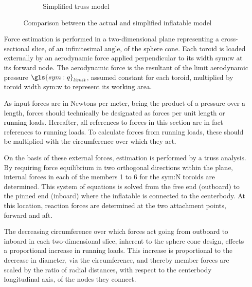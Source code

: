 \begin{figure}[h]
\begin{subfigure}[b]{0.3\textwidth}
	\caption{Simplified truss model} 
	\label{fig:TC2}
	\end{subfigure}
	\caption{Comparison between the actual and simplified inflatable model}
	\label{fig:TC}
\end{figure}

Force estimation is performed in a two-dimensional plane representing a cross-sectional slice, of an infinitesimal angle, of the sphere cone. Each toroid is loaded externally by an aerodynamic force applied perpendicular to its width \gls{sym:w} at its forward node. The aerodynamic force is the resultant of the limit aerodynamic pressure $\gls{sym:q}_{limit}$, assumed constant for each toroid, multiplied by toroid width \gls{sym:w} to represent its working area. 


As input forces are in Newtons per meter, being the product of a pressure over a length, forces should technically be designated as forces per unit length or running loads. Hereafter, all references to forces in this section are in fact references to running loads. To calculate forces from running loads, these should be multiplied with the circumference over which they act.

On the basis of these external forces, estimation is performed by a truss analysis. By requiring force equilibrium in two orthogonal directions within the plane, internal forces in each of the members 1 to 6 for the \gls{sym:N} toroids are determined. This system of equations is solved from the free end (outboard) to the pinned end (inboard) where the inflatable is connected to the centerbody. At this location, reaction forces are determined at the two attachment points, forward and aft.

The decreasing circumference over which forces act going from outboard to inboard in each two-dimensional slice, inherent to the sphere cone design, effects a proportional increase in running loads. This increase is proportional to the decrease in diameter, via the circumference, and thereby member forces are scaled by the ratio of radial distances, with respect to the centerbody longitudinal axis, of the nodes they connect.

